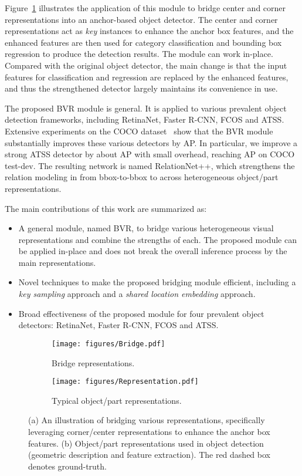 \documentclass{article}
\begin{document}
Figure~\ref{fig:representation-1} illustrates the application of this module to bridge center and corner representations into an anchor-based object detector. The center and corner representations act as \emph{key} instances to enhance the anchor box features, and the enhanced features are then used for category classification and bounding box regression to produce the detection results. The module can work in-place. Compared with the original object detector, the main change is that the input features for classification and regression are replaced by the enhanced features, and thus the strengthened detector largely maintains its convenience in use.

The proposed BVR module is general. It is applied to various prevalent object detection frameworks, including RetinaNet, Faster R-CNN, FCOS and ATSS. Extensive experiments on the COCO dataset~\cite{MSCOCO} show that the BVR module substantially improves these various detectors by  AP. In particular, we improve a strong ATSS detector by about  AP with small overhead, reaching  AP on COCO test-dev. The resulting network is named RelationNet++, which strengthens the relation modeling in \cite{hu2018relation} from bbox-to-bbox to across heterogeneous object/part representations. 

The main contributions of this work are summarized as:
\begin{itemize}
\setlength{\itemsep}{0pt}
\item A general module, named BVR, to bridge various heterogeneous visual representations and combine the strengths of each. The proposed module can be applied in-place and does not break the overall inference process by the main representations.
\item Novel techniques to make the proposed bridging module efficient, including a \emph{key sampling} approach and a \emph{shared location embedding} approach.
\item Broad effectiveness of the proposed module for four prevalent object detectors: RetinaNet, Faster R-CNN, FCOS and ATSS.
\end{itemize}

\begin{figure*}[t]
\setlength{\abovecaptionskip}{0.1cm}
\begin{subfigure}{.24\textwidth}
  \centering
\texttt{[image: figures/Bridge.pdf]}  
  \caption{Bridge representations.}
  \label{fig:representation-1}
\end{subfigure}
\begin{subfigure}{.75\textwidth}
  \centering
  \texttt{[image: figures/Representation.pdf]}
  \caption{Typical object/part representations.}
  \label{fig:representation-2}
\end{subfigure}
\caption{(a) An illustration of bridging various representations, specifically leveraging corner/center representations to enhance the anchor box features. (b) Object/part representations used in object detection (geometric description and feature extraction). The red dashed box denotes ground-truth.}
\label{fig:representation}
\vspace{-1em}
\end{figure*}
 
\end{document}
